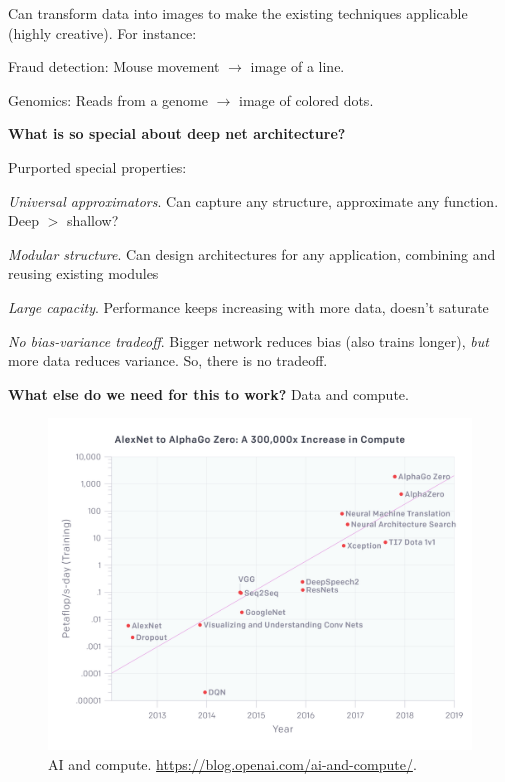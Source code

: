 \documentclass[english]{article}
\begin{document}
\item Can transform data into images to make the existing techniques applicable (highly creative). For instance: 
\bitem 
\item Fraud detection: Mouse movement $\to$ image of  a line.

\item Genomics: Reads from a genome $\to$ image of colored dots. 
\eitem 
\eenum


\item {\bf What is so special about deep net architecture?} %


Purported special properties: 
\benum
\item
\emph{Universal approximators}. Can capture any structure, approximate any function. Deep $>$ shallow?
\item  \emph{Modular structure}. Can design architectures for any application, combining and reusing existing modules
\item \emph{Large capacity}. Performance keeps increasing with more data, doesn't saturate

\item \emph{No bias-variance tradeoff}. Bigger network reduces bias (also trains longer), \emph{but} more data reduces variance. So, there is no tradeoff. 
\eenum 


\item {\bf What else do we need for this to work?} Data and compute. 

\begin{figure}
  \centering
  \includegraphics[scale=0.3]{compute_diagram-log@2x-3}
  \caption{AI and compute. \url{https://blog.openai.com/ai-and-compute/}.}
  \label{aic}
\end{figure}
\end{document}
